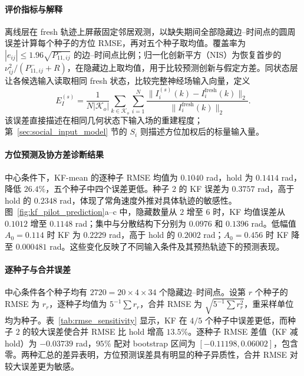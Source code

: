\documentclass[UTF8,fontset=windows,11pt]{ctexart}
\begin{document}
\paragraph{评价指标与解释}

离线层在 fresh 轨迹上屏蔽固定邻居观测，以缺失期间全部隐藏边--时间点的圆周误差计算每个种子的方位 RMSE，再对五个种子取均值。覆盖率为 $|e_{ij}|\le1.96\sqrt{P_{11,ij}^{-}}$ 的边--时间点比例；归一化创新平方（NIS）为恢复首步的 $\nu_{ij}^2/(P_{11,ij}^{-}+R)$，在隐藏边上取均值，用于比较预测创新与假定方差。同状态层让各候选输入读取相同 fresh 状态，比较完整神经场输入向量，定义
\begin{equation}
 E_I^{(s)}=\frac{1}{N|\mathcal K_o|}
 \sum_{k\in\mathcal K_o}\sum_{i=1}^N
 \frac{\|I_i^{(s)}(k)-I_i^{\mathrm{fresh}}(k)\|_2}
 {\|I_i^{\mathrm{fresh}}(k)\|_2}.
 \label{eq:pilot_input_error}
\end{equation}
该误差直接描述在相同几何状态下输入场的重建程度；第~\ref{sec:social_input_model} 节的 $S_i$ 则描述方位加权后的标量输入量。

\paragraph{方位预测及协方差诊断结果}

中心条件下，KF-mean 的逐种子 RMSE 均值为 $0.1040$ rad，hold 为 $0.1414$ rad，降低 $26.4\%$，五个种子中四个误差更低。种子 $2$ 的 KF 误差为 $0.3757$ rad，高于 hold 的 $0.2348$ rad，体现了常角速度外推对具体轨迹的敏感性。图~\ref{fig:kf_pilot_prediction}a--c 中，隐藏数量从 $2$ 增至 $6$ 时，KF 均值误差从 $0.1012$ 增至 $0.1148$ rad；集中与分散结构下分别为 $0.0976$ 和 $0.1396$ rad。低幅值 $A_0=0.114$ 时 KF 为 $0.2229$ rad，高于 hold 的 $0.2002$ rad；$A_0=0.456$ 时 KF 降至 $0.000481$ rad。这些变化反映了不同输入条件及其预热轨迹下的预测表现。

\paragraph{逐种子与合并误差}
中心条件各个种子均有 $2720=20\times4\times34$ 个隐藏边--时间点。设第 $r$ 个种子的 RMSE 为 $r_r$，逐种子均值为 $5^{-1}\sum r_r$，合并 RMSE 为 $\sqrt{5^{-1}\sum r_r^2}$，重采样单位均为种子。表~\ref{tab:rmse_sensitivity} 显示，KF 在 $4/5$ 个种子中误差更低，而种子 $2$ 的较大误差使合并 RMSE 比 hold 增高 $13.5\%$。逐种子 RMSE 差值（KF 减 hold）为 $-0.03739$ rad，$95\%$ 配对 bootstrap 区间为 $[-0.11198,0.06002]$，包含零。两种汇总的差异表明，方位预测误差具有明显的种子异质性，合并 RMSE 对较大误差更为敏感。
\end{document}
